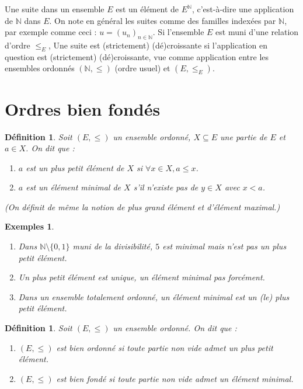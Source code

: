 \documentclass[12pt]{article}
\newtheorem{definition}[thm]{Définition}
\newtheorem{exemples}[thm]{Exemples}
\newcommand{\N}{\mathbb{N}}
\begin{document}
Une suite dans un ensemble $E$ est un élément de $E^\N$, c'est-à-dire une application de $\N$ dans $E$.
On note en général les suites comme des familles indexées par $\N$, par exemple comme ceci :  $u = (u_n)_{n\in\N}$.
Si l'ensemble $E$ est muni d'une relation d'ordre $\leq_E$, Une suite est (strictement) (dé)croissante si l'application en question est (strictement) (dé)croissante, vue comme application entre les ensembles ordonnés $(\N,\leq)$ (ordre usuel) et $(E,\leq_E)$.



\section{Ordres bien fondés}
 
\begin{definition}
Soit $(E,\leq)$ un ensemble ordonné, $X\subseteq E$ une partie de $E$ et $a\in X$.
On dit que : 
\begin{enumerate}
\item $a$ est un plus petit élément de $X$ si $\forall x \in X, a\leq x$.
\item $a$ est un élément minimal de $X$ s'il n'existe pas de $y\in X$ avec $x < a$.
\end{enumerate}
(On définit de même la notion de plus grand élément et d'élément maximal.)
\end{definition}

\begin{exemples}
\begin{enumerate}
\item Dans $\N\setminus\{0,1\}$ muni de la divisibilité, $5$ est minimal mais n'est pas un plus petit élément.
\item Un plus petit élément est unique, un élément minimal pas forcément.
\item Dans un ensemble totalement ordonné, un élément minimal est un (le) plus petit élément.
\end{enumerate}
\end{exemples}
  
\begin{definition}
Soit $(E,\leq)$ un ensemble ordonné. On dit que : 
\begin{enumerate}
\item $(E,\leq)$ est \emph{bien ordonné} si toute partie non vide admet un plus petit élément.
\item $(E,\leq)$ est \emph{bien fondé} si toute partie non vide admet un élément minimal.
\end{enumerate}
\end{definition}
 
\end{document}
